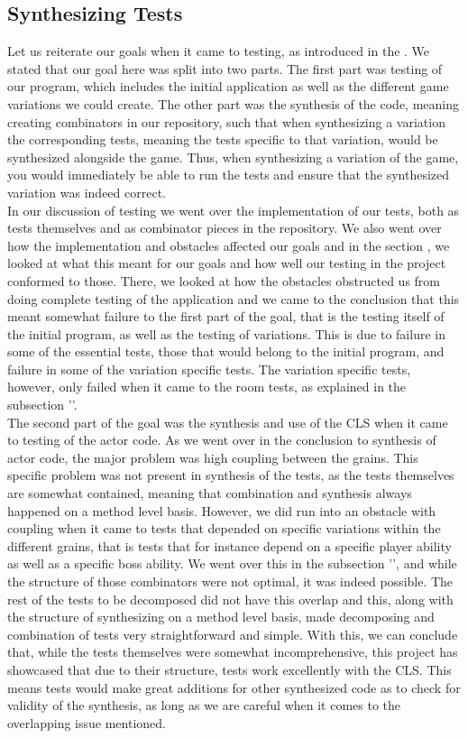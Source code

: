 \subsection{Synthesizing Tests}
Let us reiterate our goals when it came to testing, as introduced in the . We stated that our goal here was split into two parts. The first part was testing of our program, which includes the initial application as well as the different game variations we could create. The other part was the synthesis of the code, meaning creating combinators in our repository, such that when synthesizing a variation the corresponding tests, meaning the tests specific to that variation, would be synthesized alongside the game. Thus, when synthesizing a variation of the game, you would immediately be able to run the tests and ensure that the synthesized variation was indeed correct. \\
In our discussion of testing we went over the implementation of our tests, both as tests themselves and as combinator pieces in the repository. We also went over how the implementation and obstacles affected our goals and in the section , we looked at what this meant for our goals and how well our testing in the project conformed to those. There, we looked at how the obstacles obstructed us from doing complete testing of the application and we came to the conclusion that this meant somewhat failure to the first part of the goal, that is the testing itself of the initial program, as well as the testing of variations. This is due to failure in some of the essential tests, those that would belong to the initial program, and failure in some of the variation specific tests. The variation specific tests, however, only failed when it came to the room tests, as explained in the subsection ''. \\
The second part of the goal was the synthesis and use of the CLS when it came to testing of the actor code. As we went over in the conclusion to synthesis of actor code, the major problem was high coupling between the grains. This specific problem was not present in synthesis of the tests, as the tests themselves are somewhat contained, meaning that combination and synthesis always happened on a method level basis. However, we did run into an obstacle with coupling when it came to tests that depended on specific variations within the different grains, that is tests that for instance depend on a specific player ability as well as a specific boss ability. We went over this in the subsection '', and while the structure of those combinators were not optimal, it was indeed possible. The rest of the tests to be decomposed did not have this overlap and this, along with the structure of synthesizing on a method level basis, made decomposing and combination of tests very straightforward and simple. With this, we can conclude that, while the tests themselves were somewhat incomprehensive, this project has showcased that due to their structure, tests work excellently with the CLS. This means tests would make great additions for other synthesized code as to check for validity of the synthesis, as long as we are careful when it comes to the overlapping issue mentioned.
